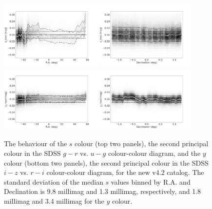 \documentclass[fleqn,usenatbib]{mnras}
\begin{document}
\begin{figure}
    \centering\includegraphics[width=0.45\textwidth]{figures/testV26vsV42_snew_u_s_new_RA_Hess_lr.png}
    \centering\includegraphics[width=0.45\textwidth]{figures/testV26vsV42_snew_u_s_new_Dec_Hess_lr.png} 
    \centering\includegraphics[width=0.45\textwidth]{figures/testV26vsV42_ynew_z_y_new_RA_Hess_lr.png} 
    \centering\includegraphics[width=0.45\textwidth]{figures/testV26vsV42_ynew_z_y_new_Dec_Hess_lr.png}  
\caption{The behaviour of the $s$ colour (top two panels), the second principal colour in the SDSS
$g-r$ vs. $u-g$ colour-colour diagram, and the $y$ colour (bottom two panels), the second 
principal colour in the SDSS $i-z$ vs. $r-i$ colour-colour diagram, for the new v4.2 catalog.
The standard deviation of the median $s$ values binned by R.A. and Declination is 9.8 millimag 
and 1.3 millimag, respectively, and 1.8 millimag and 3.4 millimag for the $y$ colour.}
\label{fig:comparesy} 
\end{figure}
\end{document}
